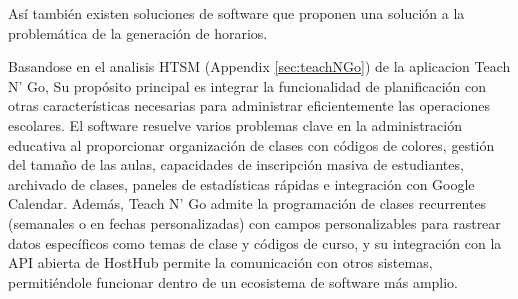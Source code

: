 Así también existen soluciones de software que proponen una solución a la problemática de la generación de horarios.

Basandose en el analisis HTSM (Appendix \ref{sec:teachNGo}) de la aplicacion Teach N' Go,
Su propósito principal es integrar la funcionalidad de planificación con otras características necesarias para administrar eficientemente las operaciones escolares.
El software resuelve varios problemas clave en la administración educativa al proporcionar organización de clases con códigos de colores, gestión del tamaño de las aulas, capacidades de inscripción masiva de estudiantes, archivado de clases, paneles de estadísticas rápidas e integración con Google Calendar.
Además, Teach N' Go admite la programación de clases recurrentes (semanales o en fechas personalizadas) con campos personalizables para rastrear datos específicos como temas de clase y códigos de curso, y su integración con la API abierta de HostHub permite la comunicación con otros sistemas, permitiéndole funcionar dentro de un ecosistema de software más amplio.
